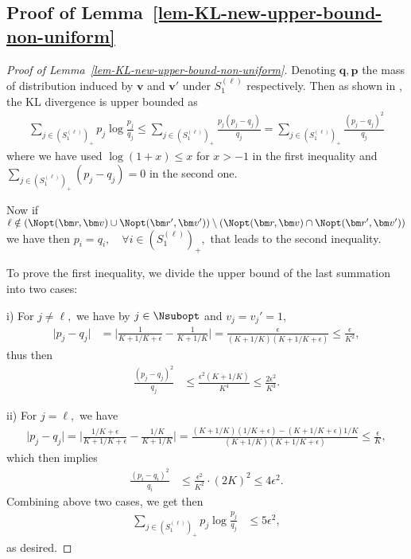 \documentclass[10pt, letterpaper]{article}
\begin{document}
\subsection{Proof of Lemma~\ref{lem-KL-new-upper-bound-non-uniform} }
\begin{proof}[Proof of Lemma~\ref{lem-KL-new-upper-bound-non-uniform}]
Denoting $\bm q, \bm p$ the mass of distribution induced by $\bm {v}$ and $\bm {v'}$ under $S^{(\ell)}_1$ respectively. 
Then as shown in \citet{chen2018note,lee2024nearly}, the KL divergence is upper bounded as \begin{align*}
    \sum_{j\in (S^{(\ell)}_1)_+} p_j \log \frac{p_j}{q_j} \leq \sum_{j\in (S^{(\ell)}_1)_+}\frac{p_j(p_j - q_j)}{q_j}= \sum_{j\in (S^{(\ell)}_1)_+}\frac{(p_j - q_j)^2}{q_j} 
\end{align*} 
where we have used $\log (1+x) \leq x$ for $x > -1$ in the first inequality and $\sum_{j\in (S^{(\ell)}_1)_+} (p_j - q_j) = 0$ in 
the second one.

Now if $\ell \notin (\Nopt(\bm r, \bm v) \cup \Nopt(\bm r', \bm v'))\setminus(\Nopt(\bm r, \bm v)\cap \Nopt(\bm r', \bm v'))$ we have then $p_i =q_i,\quad \forall i \in (S^{(\ell)}_1)_+,$ that leads to the second inequality.


To prove the first inequality, we divide the upper bound of the last summation into two cases:

\noindent i) For $j \neq \ell,$ we have by $j\in \Nsubopt$ and $v_j = v_j' =1$, \begin{align*}
    \lvert p_j - q_j\rvert &=  \Big| \frac{1}{K +1/K+ \epsilon} - \frac{1}{K+1/K} \Big|= \frac{\epsilon}{(K+1/K)(K+1/K + \epsilon)} \leq \frac{\epsilon}{K^2},
\end{align*}
thus then 
\begin{align*}
    \frac{(p_j - q_j)^2}{q_j} & \leq \frac{\epsilon^2(K+1/K) }{K^4}  \leq \frac{2\epsilon^2}{K^3} .
\end{align*}

\noindent ii) For $j = \ell,$ we have \begin{align*}
    \lvert p_j - q_j \rvert = \Big| \frac{1/K+\epsilon}{K+1/K + \epsilon} - \frac{1/K}{K+1/K}\Big| =  \frac{(K+1/K)(1/K+\epsilon) - (K+1/K+\epsilon)1/K}{(K+1/K)(K+1/K+\epsilon)} \leq \frac{\epsilon }{K},
\end{align*}
which then implies \begin{align*}
\frac{(p_i - q_i)^2}{q_i} & \leq  \frac{\epsilon^2}{K^2}\cdot (2K)^2 \leq 4\epsilon^2.
\end{align*}
Combining above two cases, we get then \begin{align*}
\sum_{j\in (S^{(\ell)}_1)_+} p_j \log \frac{p_j}{q_j} & \leq 5\epsilon^2,
\end{align*}
as desired.
\end{proof}
\end{document}
